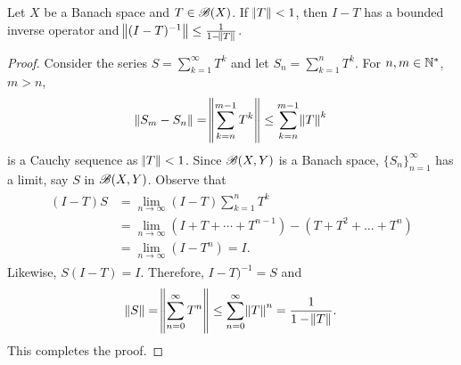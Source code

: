 \begin{thm}
\label{thm:bounded_linear_operators:i_substract_t_invertible}
Let $X$ be a Banach space and $T \in \mathscr{B}(X)$. 
If $\norm{T} < 1$, then $I - T$ has a bounded inverse operator and 
$\norm{(I - T)^{-1}} \le \frac{1}{1 - \norm{T}}$. 
\end{thm}
\begin{proof}
Consider the series $S = \sum_{k=1}^{\infty} T^k$ and let 
$S_n = \sum_{k=1}^{n} T^k$. 
For $n, m \in \mathbb{N}^\ast$, $m > n$, 
\begin{equation*}
    \norm{S_m - S_n} = \norm{\sum_{k=n}^{m-1} T^k} 
    \le \sum_{k=n}^{m-1} \norm{T}^k 
\end{equation*}
is a Cauchy sequence as $\norm{T} < 1$. 
Since $\mathscr{B}(X, Y)$ is a Banach space, $\{ S_n \}_{n=1}^{\infty}$ has a limit, 
say $S$ in $\mathscr{B}(X, Y)$. 
Observe that 
\begin{equation*}
    \begin{aligned}
        \begin{aligned}
            (I - T) S &= \lim_{n \to \infty} (I - T) \sum_{k=1}^{n} T^k \\
            &= \lim_{n \to \infty} (I + T + \cdots + T^{n-1}) 
                - (T + T^2 + \ldots + T^n) \\
            &= \lim_{n \to \infty} (I - T^n) = I. 
        \end{aligned}
    \end{aligned}
\end{equation*}
Likewise, $S(I - T) = I$. 
Therefore, $I - T)^{-1} = S$ and 
\begin{equation*}
    \norm{S} = \norm{\sum_{n=0}^{\infty} T^n} 
    \le \sum_{n=0}^{\infty} \norm{T}^n = \frac{1}{1-\norm{T}}. 
\end{equation*}
This completes the proof. 
\end{proof}

